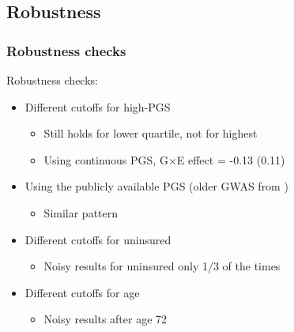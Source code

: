 \documentclass[10pt,compress,xcolor=dvipsnames,aspectratio=169]{beamer}    %
\newcounter{ex}
\newcommand{\1}[1]{\mathrm{1\hspace*{-2.5pt}l}[#1]}	%
\begin{document}
\subsection{Robustness}
\begin{frame}
\frametitle{Robustness checks}
\label{frame:robustness}

Robustness checks:

\begin{itemize}
	\item Different cutoffs for high-PGS \hyperlink{fig:coeffplot25highPGS}{}
	\begin{itemize}
		\item Still holds for lower quartile, not for highest
		\item Using continuous PGS, G$\times$E effect = -0.13 (0.11)
	\end{itemize}

	\vspace{1ex}

	\item Using the publicly available PGS (older GWAS from \cite{TAG2010}) \hyperlink{fig:oldPGS}{}
	\begin{itemize}
		\item Similar pattern
	\end{itemize}

	\vspace{1ex}

	\item Different cutoffs for uninsured \hyperlink{fig:coeffplot66unins}{}
	\begin{itemize}
		\item Noisy results for uninsured only 1/3 of the times
	\end{itemize}

	\vspace{1ex}

	\item Different cutoffs for age \hyperlink{fig:coeffplot59-71}{}
	\begin{itemize}
		\item Noisy results after age 72
	\end{itemize}
\end{itemize}

\end{frame}
\end{document}
